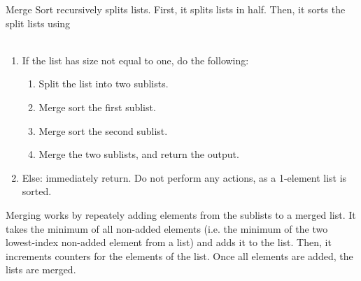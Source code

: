 \documentclass{article}
\begin{document}
Merge Sort recursively splits lists. First, it splits lists in half.
Then, it sorts the split lists using \\~\\
\begin{enumerate}[label*=\arabic*.]
    \item If the list has size not equal to one, do the following:
    \begin{enumerate}[label*=\arabic*.]
        \item Split the list into two sublists.
        \item Merge sort the first sublist.
        \item Merge sort the second sublist.
        \item Merge the two sublists, and return the output.
    \end{enumerate}
    \item Else: immediately return. Do not perform any actions,
    as a 1-element list is sorted.
\end{enumerate}
Merging works by repeately adding elements from the sublists to a
merged list. It takes the minimum of all non-added elements 
(i.e. the minimum of the two lowest-index non-added element from a list)
and adds it to the list. Then, it increments counters for the 
elements of the list. Once all elements are added, the lists are merged.
\end{document}
